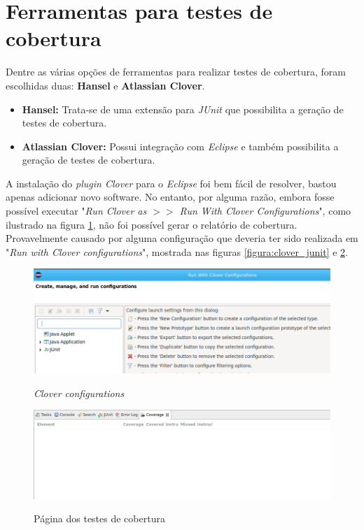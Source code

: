 \section{Ferramentas para testes de cobertura}
Dentre as várias opções de ferramentas para realizar testes de cobertura, foram escolhidas duas: \textbf{Hansel} e \textbf{Atlassian Clover}.
\begin{itemize}
    \item \textbf{Hansel:} Trata-se de uma extensão para \textit{JUnit} que possibilita a geração de testes de cobertura.
    \item \textbf{Atlassian Clover:} Possui integração com \textit{Eclipse} e também possibilita a geração de testes de cobertura.
\end{itemize}
A instalação do \textit{plugin Clover} para o \textit{Eclipse} foi bem fácil de resolver, bastou apenas adicionar novo software. No entanto, por alguma razão, embora fosse possível executar "\textit{Run Clover as $>>$ Run With Clover Configurations}", como ilustrado na figura \ref{figura:clover_configurations}, não foi possível gerar o relatório de cobertura.
Provavelmente causado por alguma configuração que deveria ter sido realizada em "\textit{Run with Clover configurations}", mostrada nas figuras \ref{figura:clover_junit} e \ref{figura:clover_coverage}.

\begin{figure}[H]
    \caption{\textit{Clover configurations}}
    \vspace{0.5cm}
    \centering
    \includegraphics[width=15cm]{imagens/clover_configurations.png}
    \label{figura:clover_configurations}
\end{figure}

\begin{figure}[H]
    \caption{Página dos testes de cobertura}
    \vspace{0.5cm}
    \centering
    \includegraphics[width=15cm]{imagens/clover_coverage.png}
    \label{figura:clover_coverage}
\end{figure}

